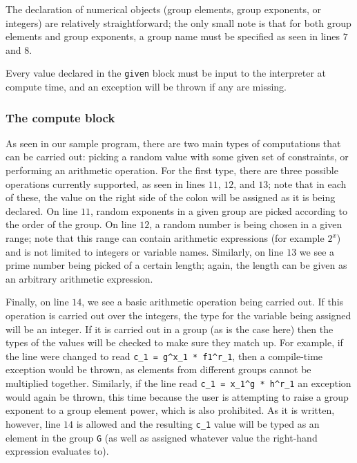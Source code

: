 \documentclass[letterpaper,11pt]{article}
\begin{document}
The declaration of numerical objects (group elements, group exponents, or
integers) are relatively straightforward; the only small note is that for both 
group elements and group exponents, a group name must be specified as seen
in lines $7$ and $8$.  

Every value declared in the \verb#given# block must be input to the
interpreter at compute time, and an exception will be thrown if any are
missing.

\subsubsection{The compute block}\label{sec:compute}

As seen in our sample program, there are two main types of computations that
can be carried out: picking a random value with some given set of constraints,
or performing an arithmetic operation.  For the first type, there are three
possible operations currently supported, as seen in lines $11$, $12$, and
$13$; note that in each of these, the value on the right side of the colon
will be assigned as it is being declared.  On line $11$, random 
exponents in a given group are picked according to the order of the group.
On line $12$, a random number is being chosen in a given range; note that this
range can contain arithmetic expressions (for example $2^x$) and is not limited
to integers or variable names.  Similarly, on line $13$ we see a prime number
being picked of a certain length; again, the length can be given as an
arbitrary arithmetic expression.

Finally, on line $14$, we see a basic arithmetic operation being carried out.
If this operation is carried out over the integers, the type for the variable
being assigned will be an integer.  If it is carried out in a group (as is the
case here) then the types of the values will be checked to make sure they
match up.  For example, if the line were changed to read 
\verb#c_1 = g^x_1 * f1^r_1#, then a compile-time exception would be thrown, as 
elements from
different groups cannot be multiplied together.  Similarly, if the line read
\verb#c_1 = x_1^g * h^r_1# an exception would again be thrown, this time
because the user is attempting to raise a group exponent to a group element
power, which is also prohibited.  As it is written, however, line $14$ is
allowed and the resulting \verb#c_1# value will be typed as an element in the
group \verb#G# (as well as assigned whatever value the right-hand expression
evaluates to).
\end{document}
